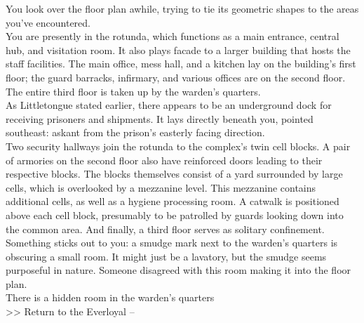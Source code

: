 You look over the floor plan awhile, trying to tie its geometric shapes to the areas you’ve encountered.\\

You are presently in the rotunda, which functions as a main entrance, central hub, and visitation room. It also plays facade to a larger building that hosts the staff facilities. The main office, mess hall, and a kitchen lay on the building’s first floor; the guard barracks, infirmary, and various offices are on the second floor. The entire third floor is taken up by the warden’s quarters.\\

As Littletongue stated earlier, there appears to be an underground dock for receiving prisoners and shipments. It lays directly beneath you, pointed southeast: askant from the prison’s easterly facing direction.\\

Two security hallways join the rotunda to the complex’s twin cell blocks. A pair of armories on the second floor also have reinforced doors leading to their respective blocks. The blocks themselves consist of a yard surrounded by large cells, which is overlooked by a mezzanine level. This mezzanine contains additional cells, as well as a hygiene processing room. A catwalk is positioned above each cell block, presumably to be patrolled by guards looking down into the common area. And finally, a third floor serves as solitary confinement.\\

Something sticks out to you: a smudge mark next to the warden’s quarters is obscuring a small room. It might just be a lavatory, but the smudge seems purposeful in nature. Someone disagreed with this room making it into the floor plan.\\
 There is a hidden room in the warden’s quarters\\

>>  Return to the Everloyal -- 
